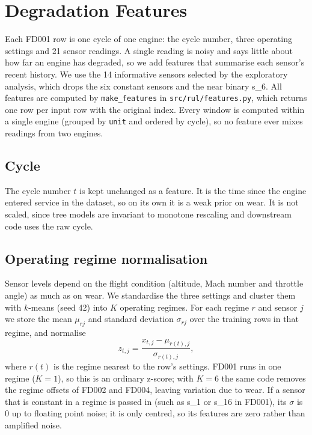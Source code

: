 \section{Degradation Features}
\label{sec:features}

Each FD001 row is one cycle of one engine: the cycle number, three
operating settings and 21 sensor readings. A single reading is noisy and
says little about how far an engine has degraded, so we add features that
summarise each sensor's recent history. We use the 14 informative sensors
selected by the exploratory analysis, which drops the six constant sensors
and the near binary s\_6. All features are computed by
\texttt{make\_features} in \texttt{src/rul/features.py}, which returns one
row per input row with the original index. Every window is computed within
a single engine (grouped by \texttt{unit} and ordered by cycle), so no
feature ever mixes readings from two engines.

\subsection{Cycle}
The cycle number $t$ is kept unchanged as a feature. It is the time since
the engine entered service in the dataset, so on its own it is a weak prior
on wear. It is not scaled, since tree models are invariant to monotone
rescaling and downstream code uses the raw cycle.

\subsection{Operating regime normalisation}
Sensor levels depend on the flight condition (altitude, Mach number and
throttle angle) as much as on wear. We standardise the three settings and
cluster them with $k$-means (seed 42) into $K$ operating regimes. For each
regime $r$ and sensor $j$ we store the mean $\mu_{rj}$ and standard
deviation $\sigma_{rj}$ over the training rows in that regime, and
normalise
\begin{equation}
z_{t,j} = \frac{x_{t,j} - \mu_{r(t),j}}{\sigma_{r(t),j}},
\end{equation}
where $r(t)$ is the regime nearest to the row's settings. FD001 runs in one
regime ($K = 1$), so this is an ordinary z-score; with $K = 6$ the same code
removes the regime offsets of FD002 and FD004, leaving variation due to
wear. If a sensor that is constant in a regime is passed in (such as
s\_1 or s\_16 in FD001), its $\sigma$ is 0 up to floating point noise; it is
only centred, so its features are zero rather than amplified noise.

